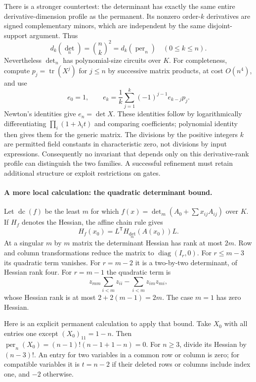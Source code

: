 \documentclass[11pt]{article}
\begin{document}
There is a stronger countertest: the determinant has exactly the same
entire derivative-dimension profile as the permanent. Its nonzero
order-$k$ derivatives are signed complementary minors, which are
independent by the same disjoint-support argument. Thus
\[
 d_k(\det_n)=\binom nk^2=d_k(\operatorname{per}_n)
 \quad(0\le k\le n).
\]
Nevertheless $\det_n$ has polynomial-size circuits over $K$. For
completeness, compute $p_j=\operatorname{tr}(X^j)$ for $j\le n$ by
successive matrix products, at cost $O(n^4)$, and use
\[
 e_0=1,\qquad
 e_k=\frac1k\sum_{j=1}^k(-1)^{j-1}e_{k-j}p_j.
\]
Newton's identities give $e_n=\det X$. These identities follow by
logarithmically differentiating
$\prod_i(1+\lambda_i t)$ and comparing coefficients; polynomial
identity then gives them for the generic matrix. The divisions by
the positive integers $k$ are permitted field constants in
characteristic zero, not divisions by input expressions.
Consequently no invariant that depends only on this derivative-rank
profile can distinguish the two families. A successful refinement
must retain additional structure or exploit restrictions on gates.

\paragraph{A more local calculation: the quadratic determinant bound.}
Let $\operatorname{dc}(f)$ be the least $m$ for which
$f(x)=\det_m(A_0+\sum x_{ij}A_{ij})$ over $K$.
If $H_f$ denotes the Hessian, the affine chain rule gives
\begin{equation}\label{vp:hessian}
 H_f(x_0)=L^{\mathsf T}H_{\det_m}(A(x_0))L.
\end{equation}
At a singular $m$ by $m$ matrix the determinant Hessian has rank at
most $2m$. Row and column transformations reduce the matrix to
$\operatorname{diag}(I_r,0)$. For $r\le m-3$ its quadratic term
vanishes. For $r=m-2$ it is a two-by-two determinant, of Hessian
rank four. For $r=m-1$ the quadratic term is
\[
 z_{mm}\sum_{i<m}z_{ii}-\sum_{i<m}z_{im}z_{mi},
\]
whose Hessian rank is at most $2+2(m-1)=2m$.
The case $m=1$ has zero Hessian.

Here is an explicit permanent calculation to apply that bound.
Take $X_0$ with all entries one except $(X_0)_{11}=1-n$.
Then $\operatorname{per}_n(X_0)=(n-1)!(n-1+1-n)=0$.
For $n\ge3$, divide its Hessian by $(n-3)!$.
An entry for two variables in a common row or column is zero;
for compatible variables it is $t=n-2$ if their deleted rows or
columns include index one, and $-2$ otherwise.
\end{document}
